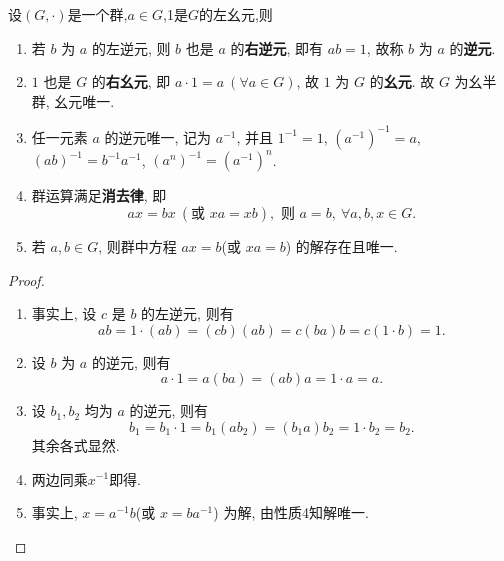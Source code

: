 \documentclass[../../main.tex]{subfiles}
\begin{document}
\begin{theorem}[群的基本性质]
设$(G,\cdot)$是一个群,$a\in G$,1是$G$的左幺元,则
\begin{enumerate}
\item 若 \( b \) 为 \( a \) 的左逆元, 则 \( b \) 也是 \( a \) 的\textbf{右逆元}, 即有 \( ab = 1 \), 故称 \( b \) 为 \( a \) 的\textbf{逆元}.

\item \( 1 \) 也是 \( G \) 的\textbf{右幺元}, 即 \( a \cdot 1 = a \ (\forall a \in G) \), 故 \( 1 \) 为 \( G \) 的\textbf{幺元}. 故 \( G \) 为幺半群, 幺元唯一.

\item 任一元素 \( a \) 的逆元唯一, 记为 \( a^{-1} \), 并且 \( 1^{-1} = 1 \), \( (a^{-1})^{-1} = a \), \( (ab)^{-1} = b^{-1}a^{-1} \), \( (a^n)^{-1} = (a^{-1})^n \).

\item 群运算满足\textbf{消去律}, 即
\[
ax = bx \ (\text{或 } xa = xb), \text{ 则 } a = b, \ \forall a, b, x \in G.
\]

\item 若 \( a, b \in G \), 则群中方程 \( ax = b \)(或 \( xa = b \)) 的解存在且唯一.
\end{enumerate}
\end{theorem}
\begin{proof}
\begin{enumerate}
\item 事实上, 设 \( c \) 是 \( b \) 的左逆元, 则有
\[
ab = 1 \cdot (ab) = (cb)(ab) = c(ba)b = c(1 \cdot b) = 1.
\]

\item 设 \( b \) 为 \( a \) 的逆元, 则有
\[
a \cdot 1 = a(ba) = (ab)a = 1 \cdot a = a.
\]

\item 设 \( b_1, b_2 \) 均为 \( a \) 的逆元, 则有
\[
b_1 = b_1 \cdot 1 = b_1(ab_2) = (b_1a)b_2 = 1 \cdot b_2 = b_2.
\]
其余各式显然.

\item 两边同乘$x^{-1}$即得.

\item 事实上, \( x = a^{-1}b \)(或 \( x = ba^{-1} \)) 为解, 由性质4知解唯一.
\end{enumerate}

\end{proof}
\end{document}
